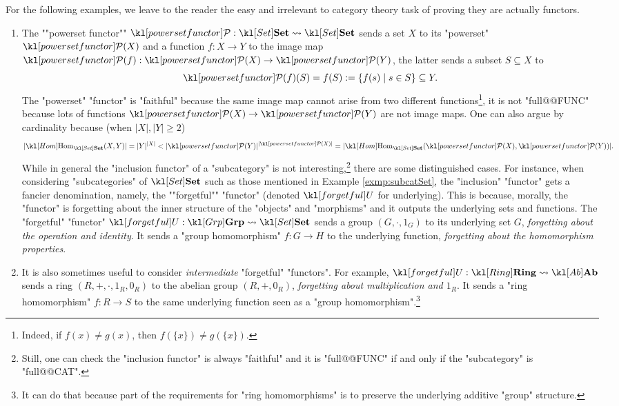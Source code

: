 \documentclass[main.tex]{subfiles}
\begin{document}
\begin{exmps}\label{exmp:functors}
	For the following examples, we leave to the reader the easy and irrelevant to category theory task of proving they are actually functors.%
	\begin{enumerate}
		\item The ""powerset functor"" $\mPcov: \catSet \rightsquigarrow \catSet$ sends a set $X$ to its "powerset" $\mPcov(X)$ and a function $f: X\rightarrow Y$ to the image map $\mPcov(f):\mPcov(X)\rightarrow \mPcov(Y)$, the latter sends a subset $S\subseteq X$ to \[\mPcov(f)(S)= f(S) := \{f(s) \mid s \in S\} \subseteq Y.\]
		The "powerset" "functor" is "faithful" because the same image map cannot arise from two different functions\footnote{Indeed, if $f(x) \neq g(x)$, then $f(\{x\}) \neq g(\{x\})$.}, it is not "full@@FUNC" because lots of functions $\mPcov(X) \rightarrow \mPcov(Y)$ are not image maps. One can also argue by cardinality because (when $|X|, |Y| \geq 2$)
		\[|\Hom_{\catSet}(X,Y)| = |Y|^{|X|} < |\mPcov(Y)|^{|\mPcov(X)|} = |\Hom_{\catSet}(\mPcov(X), \mPcov(Y))|.\]
		\itemAP While in general the "inclusion functor" of a "subcategory" is not interesting,\footnote{Still, one can check the "inclusion functor" is always "faithful" and it is "full@@FUNC" if and only if the "subcategory" is "full@@CAT".} there are some distinguished cases. For instance, when considering "subcategories" of $\catSet$ such as those mentioned in Example \ref{exmp:subcatSet}, the "inclusion" "functor" gets a fancier denomination, namely, the ""forgetful"" "functor" (denoted $\forget$ for underlying). This is because, morally, the "functor" is forgetting about the inner structure of the "objects" and "morphisms" and it outputs the underlying sets and functions. The "forgetful" "functor" $\forget: \catGrp \rightsquigarrow \catSet$ sends a group $(G,\cdot,1_G)$ to its underlying set $G$, \textit{forgetting about the operation and identity}. It sends a "group homomorphism" $f: G \rightarrow H$ to the underlying function, \textit{forgetting about the homomorphism properties}.
		
		\item It is also sometimes useful to consider \textit{intermediate} "forgetful" "functors". For example, $\forget: \catRing \rightsquigarrow \catAb$ sends a ring $(R, +, \cdot, 1_R, 0_R)$ to the abelian group $(R, +, 0_R)$, \textit{forgetting about multiplication and $1_R$}. It sends a "ring homomorphism" $f: R \rightarrow S$ to the same underlying function seen as a "group homomorphism".\footnote{It can do that because part of the requirements for "ring homomorphisms" is to preserve the underlying additive "group" structure.}
		

\end{enumerate}
\end{exmps}
\end{document}
